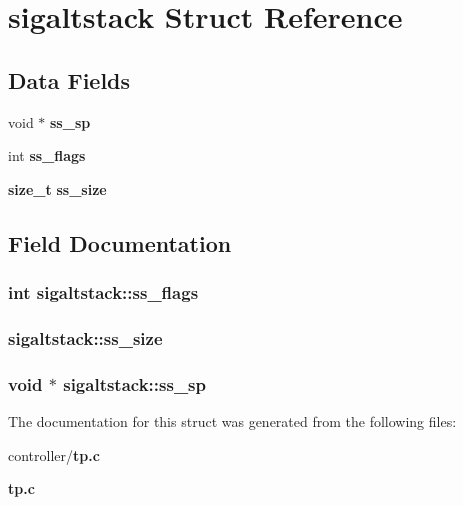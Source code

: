 \section{sigaltstack Struct Reference}
\label{structsigaltstack}
\subsection*{Data Fields}
\begin{DoxyCompactItemize}
\item 
void $\ast$ {\bf ss\_\-sp}
\item 
int {\bf ss\_\-flags}
\item 
{\bf size\_\-t} {\bf ss\_\-size}
\end{DoxyCompactItemize}


\subsection{Field Documentation}
\subsubsection[{ss\_\-flags}]{\setlength{\rightskip}{0pt plus 5cm}int {\bf sigaltstack::ss\_\-flags}}\label{structsigaltstack_a173db1abf4231d1850b2595a01ebc9e2}
\subsubsection[{ss\_\-size}]{ {\bf sigaltstack::ss\_\-size}}\label{structsigaltstack_a0a5016360b089485d55a5ad785f5bddc}
\subsubsection[{ss\_\-sp}]{\setlength{\rightskip}{0pt plus 5cm}void $\ast$ {\bf sigaltstack::ss\_\-sp}}\label{structsigaltstack_a366cdbadb5cb79396f7832690c72ad85}


The documentation for this struct was generated from the following files:\begin{DoxyCompactItemize}
\item 
controller/{\bf tp.c}\item 
{\bf tp.c}\end{DoxyCompactItemize}
